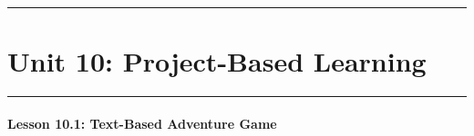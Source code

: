 \documentclass[
  justified,
  openright,
]{tufte-book}
\let\subsection\paragraph
\let\paragraph\paragraph
\let\subsection\paragraph
\let\paragraph\paragraph
\begin{document}
\begin{center}\rule{0.5\linewidth}{0.5pt}\end{center}

\section{Unit 10: Project-Based
Learning}\label{unit-10-project-based-learning-1}

\begin{center}\rule{0.5\linewidth}{0.5pt}\end{center}

\subsection{Lesson 10.1: Text-Based Adventure
Game}\label{lesson-10.1-text-based-adventure-game}
\end{document}
